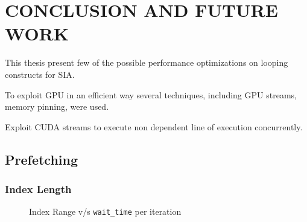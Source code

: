 \chapter{CONCLUSION AND FUTURE WORK}\label{conclusion}

This thesis present few of the possible performance optimizations on looping
constructs for SIA.

To exploit GPU in an efficient way several techniques, including GPU streams,
memory pinning, were used.

Exploit CUDA streams to execute non dependent line of execution concurrently.

\section{Prefetching}
\subsection{Index Length}
\begin{figure}[h]
  \centering
  \caption{Index Range v/s \texttt{wait\_time} per iteration}
\end{figure}